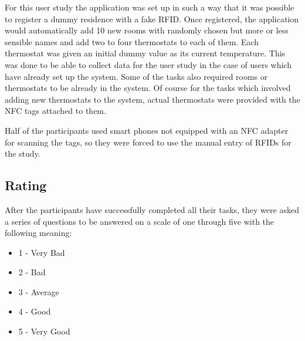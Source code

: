 For this user study the application was set up in such a way that it was possible to register a dummy residence with a fake RFID. Once registered, the application would automatically add 10 new rooms with randomly chosen but more or less sensible names and add two to four thermostats to each of them. Each thermostat was given an initial dummy value as its current temperature. This was done to be able to collect data for the user study in the case of users which have already set up the system. Some of the tasks also required rooms or thermostats to be already in the system. Of course for the tasks which involved adding new thermostats to the system, actual thermostats were provided with the NFC tags attached to them.

Half of the participants used smart phones not equipped with an NFC adapter for scanning the tags, so they were forced to use the manual entry of RFIDs for the study.

\subsection{Rating}
\label{sec:rating}
After the participants have successfully completed all their tasks, they were asked a series of questions to be answered on a scale of one through five with the following meaning:
\begin{itemize}
\item{1 - Very Bad}
\item{2 - Bad}
\item{3 - Average}
\item{4 - Good}
\item{5 - Very Good}
\end{itemize}

